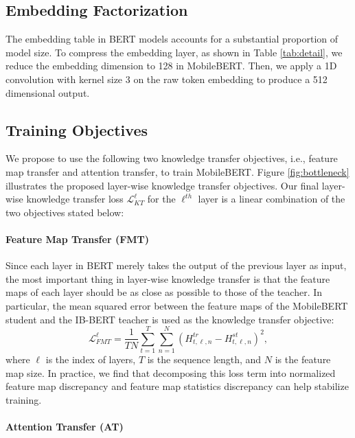 \documentclass[11pt,a4paper]{article}
\begin{document}
\subsection{Embedding Factorization}

The embedding table in BERT models accounts for a substantial proportion of model size. To compress the embedding layer, as shown in Table \ref{tab:detail}, 
we reduce the embedding dimension to 128 in MobileBERT. Then, we apply a 1D convolution with kernel size 3 on the raw token embedding to produce a 512 dimensional output.





\subsection{Training Objectives}





We propose to use the following two knowledge transfer objectives, i.e., feature map transfer and attention transfer, to train MobileBERT. 
Figure \ref{fig:bottleneck} illustrates the proposed layer-wise knowledge transfer objectives. Our final layer-wise knowledge transfer loss $\mathcal{L}_{KT}^\ell$ for the $\ell^{th}$ layer is a linear combination of the two objectives stated below:


\paragraph{Feature Map Transfer (FMT)}
Since each layer in BERT merely takes the output of the previous layer as input, the most important thing in layer-wise knowledge transfer is that the feature maps of each layer should be as close as possible to those of the teacher. In particular, the mean squared error between the feature maps of the MobileBERT student and the IB-BERT teacher is used as the knowledge transfer objective:
\useshortskip
\begin{equation}
\mathcal{L}_{FMT}^\ell = \frac{1}{TN}\sum_{t=1}^T\sum_{n=1}^N(H^{tr}_{t,\ell,n}-H^{st}_{t,\ell,n})^2,
\end{equation}
where $\ell$ is the index of layers, $T$ is the sequence length, and $N$ is the feature map size.
In practice, we find that decomposing this loss term into normalized feature map discrepancy and feature map statistics discrepancy can help stabilize training.

\paragraph{Attention Transfer (AT)}
\end{document}
